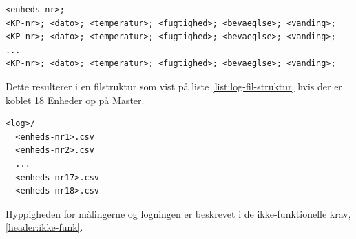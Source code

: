 \begin{lstlisting}[caption=Semikolon-separeret datafil til log af enheder, label={list:log-csv-struktur}]
<enheds-nr>;
<KP-nr>; <dato>; <temperatur>; <fugtighed>; <bevaeglse>; <vanding>;
<KP-nr>; <dato>; <temperatur>; <fugtighed>; <bevaeglse>; <vanding>;
...
<KP-nr>; <dato>; <temperatur>; <fugtighed>; <bevaeglse>; <vanding>;
\end{lstlisting}

Dette resulterer i en filstruktur som vist på liste \ref{list:log-fil-struktur} hvis der er koblet 18 Enheder op på Master.

\begin{lstlisting}[caption=Filstruktur for logfiler på Master, label={list:log-fil-struktur}]
<log>/
  <enheds-nr1>.csv
  <enheds-nr2>.csv
  ...
  <enheds-nr17>.csv
  <enheds-nr18>.csv
\end{lstlisting}

Hyppigheden for målingerne og logningen er beskrevet i de ikke-funktionelle krav, \ref{header:ikke-funk}.
